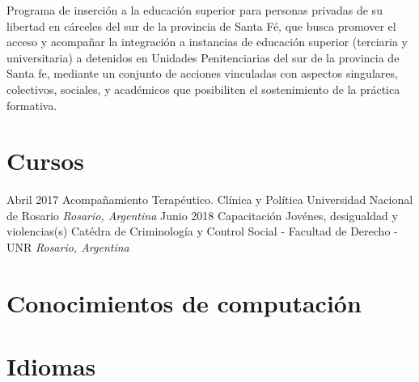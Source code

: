 \documentclass[11pt,a4paper,sans]{moderncv}        %
\begin{document}
\vspace{2mm}

  {
    Programa de inserción a la educación superior para personas privadas de su libertad en cárceles del sur de la provincia de Santa Fé, que busca promover el acceso y acompañar la integración a instancias de educación superior (terciaria y universitaria) a detenidos en Unidades Penitenciarias del sur de la provincia de Santa fe, mediante un conjunto de acciones vinculadas con aspectos singulares, colectivos, sociales, y académicos que posibiliten el sostenimiento de la práctica formativa.
  }

\vspace{2mm}

\section{Cursos}
\cventry
{Abril 2017}
{Acompañamiento Terap\'eutico. Clínica y Política}
{Universidad Nacional de Rosario}
{}
{\textit{Rosario, Argentina}}
{}
\cventry
{Junio 2018}
{Capacitación Jovénes, desigualdad y violencias(s)}
{Catédra de Criminología y Control Social - Facultad de Derecho - UNR}
{}
{\textit{Rosario, Argentina}}
{}
\vspace{2mm}

\section{Conocimientos de computaci\'on}
\vspace{2mm}

\section{Idiomas}

\vspace{2mm}

\end{document}
